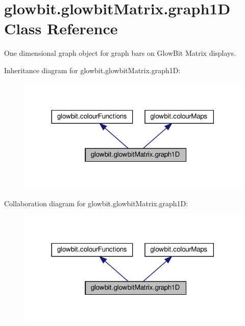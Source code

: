 \hypertarget{classglowbit_1_1glowbitMatrix_1_1graph1D}{}\section{glowbit.\+glowbit\+Matrix.\+graph1D Class Reference}
\label{classglowbit_1_1glowbitMatrix_1_1graph1D}


One dimensional graph object for graph bars on Glow\+Bit Matrix displays.  




Inheritance diagram for glowbit.\+glowbit\+Matrix.\+graph1D\+:\nopagebreak
\begin{figure}[H]
\begin{center}
\leavevmode
\includegraphics[width=318pt]{classglowbit_1_1glowbitMatrix_1_1graph1D__inherit__graph}
\end{center}
\end{figure}


Collaboration diagram for glowbit.\+glowbit\+Matrix.\+graph1D\+:\nopagebreak
\begin{figure}[H]
\begin{center}
\leavevmode
\includegraphics[width=318pt]{classglowbit_1_1glowbitMatrix_1_1graph1D__coll__graph}
\end{center}
\end{figure}
